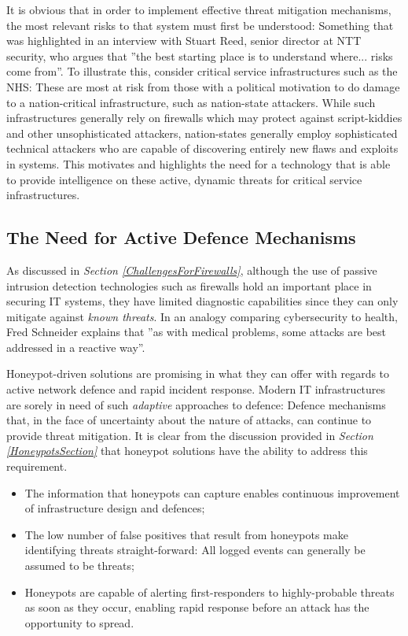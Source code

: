 It is obvious that in order to implement effective threat mitigation mechanisms, the most relevant risks to that system must first be understood: Something that was highlighted in an interview with Stuart Reed, senior director at NTT security, who argues that ''the best starting place is to understand where... risks come from''. \cite{MANSFIELDDEVINE201716} To illustrate this, consider critical service infrastructures such as the NHS: These are most at risk from those with a political motivation to do damage to a nation-critical infrastructure, such as nation-state attackers. While such infrastructures generally rely on firewalls which may protect against script-kiddies and other unsophisticated attackers, nation-states generally employ sophisticated technical attackers who are capable of discovering entirely new flaws and exploits in systems. This motivates and highlights the need for a technology that is able to provide intelligence on these active, dynamic threats for critical service infrastructures.


\subsection{The Need for Active Defence Mechanisms}
As discussed in \textit{Section \ref{ChallengesForFirewalls}}, although the use of passive intrusion detection technologies such as firewalls hold an important place in securing IT systems, they have limited diagnostic capabilities since they can only mitigate against \textit{known threats}. In an analogy comparing cybersecurity to health, Fred Schneider explains that ''as with medical problems, some attacks are best addressed in a reactive way''. \cite{Schneider11_BlueprintForScienceOfCybersecurity} 

Honeypot-driven solutions are promising in what they can offer with regards to active network defence and rapid incident response. Modern IT infrastructures are sorely in need of such \textit{adaptive} approaches to defence: Defence mechanisms that, in the face of uncertainty about the nature of attacks, can continue to provide threat mitigation. It is clear from the discussion provided in \textit{Section \ref{HoneypotsSection}} that honeypot solutions have the ability to address this requirement.

\begin{itemize}
\item The information that honeypots can capture enables continuous improvement of infrastructure design and defences;
\item The low number of false positives that result from honeypots make identifying threats straight-forward: All logged events can generally be assumed to be threats;
\item Honeypots are capable of alerting first-responders to highly-probable threats as soon as they occur, enabling rapid response before an attack has the opportunity to spread.
\end{itemize}

